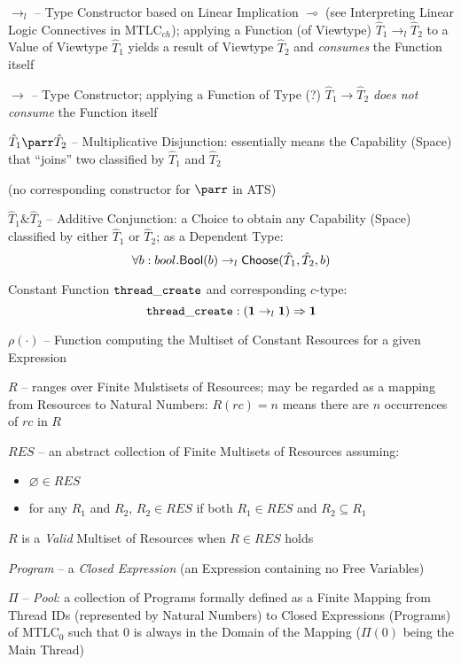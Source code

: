 $\rightarrow_l$ -- Type Constructor based on Linear Implication
$\multimap$ (see Interpreting Linear Logic Connectives in
MTLC$_{ch}$); applying a Function (of Viewtype) $\hat{T}_1
\rightarrow_l \hat{T}_2$ to a Value of Viewtype $\hat{T}_1$ yields a
result of Viewtype $\hat{T}_2$ and \emph{consumes} the Function itself

$\rightarrow$ -- Type Constructor; applying a Function of Type (?)
$\hat{T}_1 \rightarrow \hat{T}_2$ \emph{does not consume} the Function
itself

$\hat{T}_1 \parr \hat{T}_2$ -- Multiplicative Disjunction: essentially
means the Capability (Space) that ``joins'' two classified by
$\hat{T}_1$ and $\hat{T}_2$

(no corresponding constructor for $\parr$ in ATS)

$\hat{T}_1 \& \hat{T}_2$ -- Additive Conjunction: a Choice to obtain
any Capability (Space) classified by either $\hat{T}_1$ or
$\hat{T}_2$; as a Dependent Type:
\[
  \forall b : bool. \mathsf{Bool}(b)
    \rightarrow_l \mathsf{Choose}(\hat{T}_1, \hat{T}_2, b)
\]

Constant Function $\mathtt{thread\_create}$ and corresponding $c$-type:
\[
  \mathtt{thread\_create} : (\mathbf{1} \rightarrow_l \mathbf{1}) \Rightarrow \mathbf{1}
\]

$\rho(\cdot)$ -- Function computing the Multiset of Constant Resources
for a given Expression %

$R$ -- ranges over Finite Mulstisets of Resources; may be regarded as
a mapping from Resources to Natural Numbers: $R(rc) = n$ means there
are $n$ occurrences of $rc$ in $R$

$RES$ -- an abstract collection of Finite Multisets of Resources
assuming:
\begin{itemize}
  \item $\varnothing \in RES$
  \item for any $R_1$ and $R_2$, $R_2 \in RES$ if both $R_1 \in RES$
    and $R_2 \subseteq R_1$
\end{itemize}
$R$ is a \emph{Valid} Multiset of Resources when $R \in RES$ holds

\emph{Program} -- a \emph{Closed Expression} (an Expression containing
no Free Variables)

$\Pi$ -- \emph{Pool}: a collection of Programs formally defined as a
Finite Mapping from Thread IDs (represented by Natural Numbers) to
Closed Expressions (Programs) of MTLC$_0$ such that $0$ is always in
the Domain of the Mapping ($\Pi(0)$ being the Main Thread)

